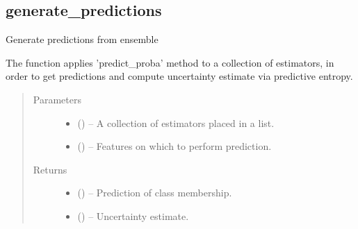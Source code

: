 \documentclass[a4paper,10pt,english]{sphinxmanual}
\begin{document}
\subsection{generate\_predictions}
\label{\detokenize{api/ucf.generate_predictions:generate-predictions}}\label{\detokenize{api/ucf.generate_predictions::doc}}

\begin{fulllineitems}
\label{\detokenize{api/ucf.generate_predictions:ucf.generate_predictions}}
Generate predictions from ensemble

The function applies 'predict\_proba' method to a collection
of estimators, in order to get predictions and compute uncertainty
estimate via predictive entropy.
\begin{quote}\begin{description}
\item[{Parameters}] \leavevmode\begin{itemize}
\item {} 
 () -- A collection of estimators placed in a list.

\item {} 
 () -- Features on which to perform prediction.

\end{itemize}

\item[{Returns}] \leavevmode
\begin{itemize}
\item {} 
 () -- Prediction of class membership.

\item {} 
 () -- Uncertainty estimate.

\end{itemize}


\end{description}\end{quote}

\end{fulllineitems}
\end{document}
